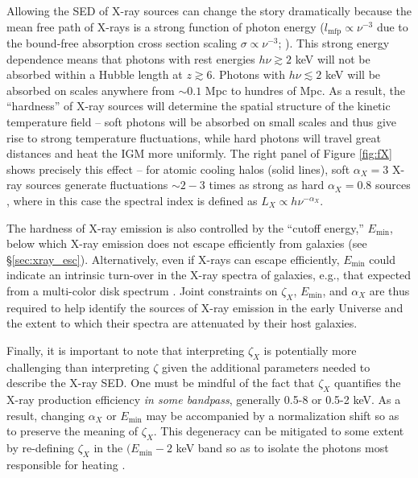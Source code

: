 Allowing the SED of X-ray sources can change the story dramatically because the mean free path of X-rays is a strong function of photon energy ($l_{\mathrm{mfp}} \propto \nu^{-3}$ due to the bound-free absorption cross section scaling $\sigma \propto \nu^{-3}$; \cite{Verner1996}). This strong energy dependence means that photons with rest energies $h\nu \gtrsim 2$ keV will not be absorbed within a Hubble length at $z \gtrsim 6$. Photons with $h\nu \lesssim 2$ keV will be absorbed on scales anywhere from $\sim 0.1$ Mpc to hundres of Mpc. As a result, the ``hardness'' of X-ray sources will determine the spatial structure of the kinetic temperature field -- soft photons will be absorbed on small scales and thus give rise to strong temperature fluctuations, while hard photons will travel great distances and heat the IGM more uniformly. The right panel of Figure \ref{fig:fX} shows precisely this effect -- for atomic cooling halos (solid lines), soft $\alpha_X = 3$ X-ray sources generate fluctuations $\sim 2-3$ times as strong as hard $\alpha_X=0.8$ sources \cite{Pacucci2014}, where in this case the spectral index is defined as $L_X \propto h\nu^{-\alpha_X}$.

The hardness of X-ray emission is also controlled by the ``cutoff energy,'' $E_{\min}$, below which X-ray emission does not escape efficiently from galaxies (see \S\ref{sec:xray_esc}). Alternatively, even if X-rays can escape efficiently, $E_{\min}$ could indicate an intrinsic turn-over in the X-ray spectra of galaxies, e.g., that expected from a multi-color disk spectrum \cite{Mitsuda1984}. Joint constraints on $\zeta_X$, $E_{\min}$, and $\alpha_X$ are thus required to help identify the sources of X-ray emission in the early Universe and the extent to which their spectra are attenuated by their host galaxies.

Finally, it is important to note that interpreting $\zeta_X$ is potentially more challenging than interpreting $\zeta$ given the additional parameters needed to describe the X-ray SED. One must be mindful of the fact that $\zeta_X$ quantifies the X-ray production efficiency \textit{in some bandpass}, generally 0.5-8 or 0.5-2 keV. As a result, changing $\alpha_X$ or $E_{\min}$ may be accompanied by a normalization shift so as to preserve the meaning of $\zeta_X$. This degeneracy can be mitigated to some extent by re-defining $\zeta_X$ in the $(E_{\min}-2$ keV band so as to isolate the photons most responsible for heating \cite{Greig2017}.


